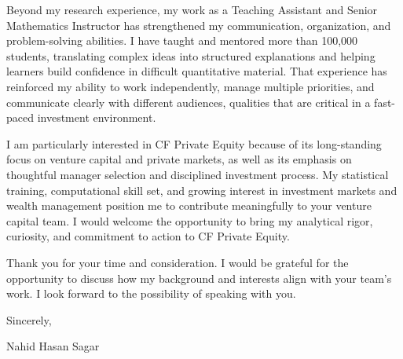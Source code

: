 \documentclass[10pt,letterpaper]{article}
\begin{document}
Beyond my research experience, my work as a Teaching Assistant and Senior Mathematics Instructor has strengthened my communication, organization, and problem-solving abilities. I have taught and mentored more than 100,000 students, translating complex ideas into structured explanations and helping learners build confidence in difficult quantitative material. That experience has reinforced my ability to work independently, manage multiple priorities, and communicate clearly with different audiences, qualities that are critical in a fast-paced investment environment.

I am particularly interested in CF Private Equity because of its long-standing focus on venture capital and private markets, as well as its emphasis on thoughtful manager selection and disciplined investment process. My statistical training, computational skill set, and growing interest in investment markets and wealth management position me to contribute meaningfully to your venture capital team. I would welcome the opportunity to bring my analytical rigor, curiosity, and commitment to action to CF Private Equity.

Thank you for your time and consideration. I would be grateful for the opportunity to discuss how my background and interests align with your team’s work. I look forward to the possibility of speaking with you.

\vspace{1em}

Sincerely,\\
\vspace{1em}

Nahid Hasan Sagar
\end{document}
